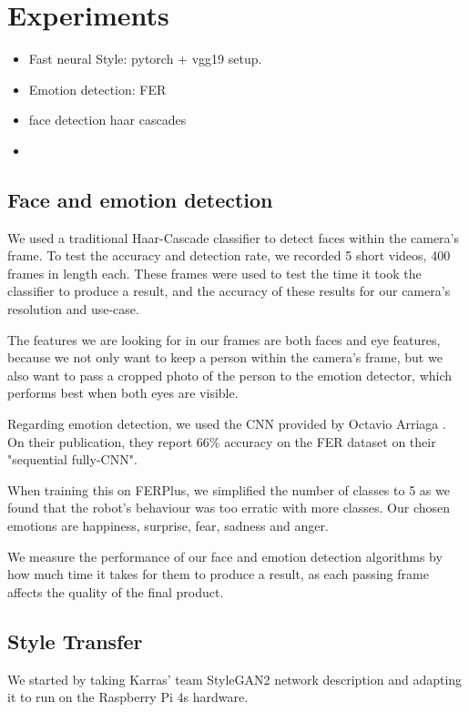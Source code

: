 \section{Experiments}

\begin{itemize}
  \item Fast neural Style: pytorch + vgg19 setup.
  \item Emotion detection: FER
  \item face detection haar cascades
  \item 
\end{itemize}


\subsection{Face and emotion detection}

We used a traditional Haar-Cascade classifier to detect faces within the camera's frame. To test the accuracy and detection rate, we recorded 5 short videos, 400 frames in length each. These frames were used to test the time it took the classifier to produce a result, and the accuracy of these results for our camera's resolution and use-case. 

The features we are looking for in our frames are both faces and eye features, because we not only want to keep a person within the camera's frame, but we also want to pass a cropped photo of the person to the emotion detector, which performs best when both eyes are visible. 

Regarding emotion detection, we used the CNN provided by Octavio Arriaga \cite{DBLP:journals/corr/abs-1710-07557}. On their publication, they report 66\% accuracy on the FER dataset on their "sequential fully-CNN".

When training this on FERPlus, we simplified the number of classes to 5 as we found that the robot's behaviour was too erratic with more classes. Our chosen emotions are happiness, surprise, fear, sadness and anger.


We measure the performance of our face and emotion detection algorithms by how much time it takes for them to produce a result, as each passing frame affects the quality of the final product.

\subsection{Style Transfer}


We started by taking Karras' team StyleGAN2 network description and adapting it to run on the Raspberry Pi 4s hardware. 


